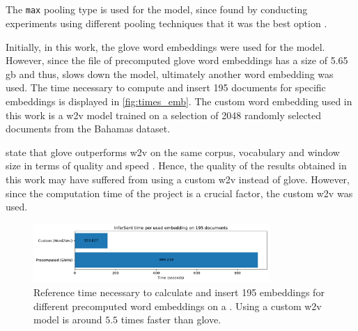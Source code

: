\subsection*{\infersent{}}\label{subsec:evaluation-inferSent}

The \texttt{max} pooling type is used for the \infersent{} model, since \citeauthor{inferSent2018} 
found by conducting experiments using different pooling techniques that it was the best option \cite{inferSent2018}.

Initially, in this work, the \ac{glove} word embeddings were used for the \infersent{} model.
However, since the file of precomputed \acs{glove} word embeddings has a size of 5.65 \ac{gb} and thus,
slows down the model, ultimately another word embedding was used.
The time necessary to compute and insert 195 documents for specific embeddings is displayed in \autoref{fig:times_emb}.
The custom word embedding used in this work is a \ac{w2v} model trained on a selection of 2048 randomly selected documents from the Bahamas dataset.

\citeauthor{glove2014} state that \acs{glove} outperforms \ac{w2v} on the same corpus, 
vocabulary and window size in terms of quality and speed \cite{glove2014}.
Hence, the quality of the results obtained in this work may have suffered from using a custom \ac{w2v} instead of \acs{glove}.
However, since the computation time of the project is a crucial factor, the custom \ac{w2v} was used.

\begin{figure}%
    \centering
    \includegraphics[width=0.8\textwidth]{images/embeddings/infersent/InferSent_time_per_used_embedding_on_195_documents.pdf}
    \caption[Times for \infersent{} embeddings per precomputed word embedding]
    {Reference time necessary to calculate and insert 195 \infersent{} embeddings for different precomputed word embeddings on a \localMaschineStats{}.
    Using a custom \ac{w2v} model is around $5.5$ times faster than \ac{glove}.
    }
    \label{fig:times_emb}%
\end{figure}
